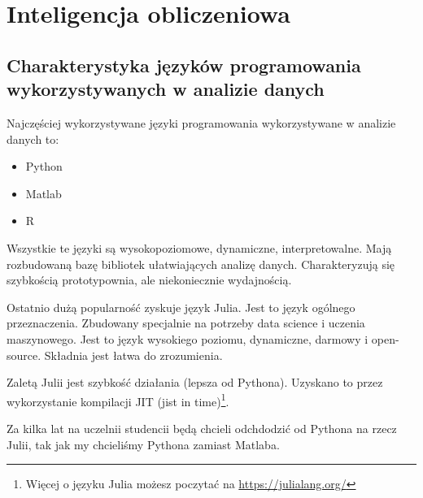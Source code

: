 \documentclass[wi]{zut}
\begin{document}
\section{Inteligencja obliczeniowa}

\subsection{Charakterystyka języków programowania wykorzystywanych w analizie danych}

Najczęściej wykorzystywane języki programowania wykorzystywane w analizie danych to:

\begin{itemize}
    \item Python
    \item Matlab
    \item R
\end{itemize}

Wszystkie te języki są wysokopoziomowe, dynamiczne, interpretowalne. Mają rozbudowaną bazę bibliotek ułatwiających analizę danych. Charakteryzują się szybkością prototypownia, ale niekoniecznie wydajnością.

Ostatnio dużą popularność zyskuje język Julia. Jest to język ogólnego przeznaczenia. Zbudowany specjalnie na potrzeby data science i uczenia maszynowego. Jest to język wysokiego poziomu, dynamiczne, darmowy i open-source. Składnia jest łatwa do zrozumienia. 

Zaletą Julii jest szybkość działania (lepsza od Pythona). Uzyskano to przez wykorzystanie kompilacji JIT (jist in time)\footnote{Więcej o języku Julia możesz poczytać na \url{https://julialang.org/}}. 

Za kilka lat na uczelnii studencii będą chcieli odchdodzić od Pythona na rzecz Julii, tak jak my chcieliśmy Pythona zamiast Matlaba.



\end{document}
